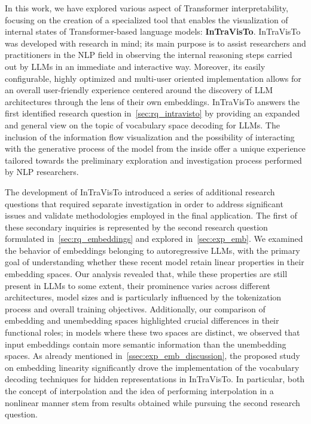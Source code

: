 In this work, we have explored various aspect of Transformer interpretability, focusing on the creation of a specialized tool that enables the visualization of internal states of Transformer-based language models: \textbf{InTraVisTo}.
InTraVisTo was developed with research in mind; its main purpose is to assist researchers and practitioners in the NLP field in observing the internal reasoning steps carried out by LLMs in an immediate and interactive way.
Moreover, its easily configurable, highly optimized and multi-user oriented implementation allows for an overall user-friendly experience centered around the discovery of LLM architectures through the lens of their own embeddings.
InTraVisTo answers the first identified research question in~\cref{sec:rq_intravisto} by providing an expanded and general view on the topic of vocabulary space decoding for LLMs.
The inclusion of the information flow visualization and the possibility of interacting with the generative process of the model from the inside offer a unique experience tailored towards the preliminary exploration and investigation process performed by NLP researchers.

The development of InTraVisTo introduced a series of additional research questions that required separate investigation in order to address significant issues and validate methodologies employed in the final application.
The first of these secondary inquiries is represented by the second research question formulated in~\cref{sec:rq_embeddings} and explored in~\cref{sec:exp_emb}.
We examined the behavior of embeddings belonging to autoregressive LLMs, with the primary goal of understanding whether these recent model retain linear properties in their embedding spaces.
Our analysis revealed that, while these properties are still present in LLMs to some extent, their prominence varies across different architectures, model sizes and is particularly influenced by the tokenization process and overall training objectives.
Additionally, our comparison of embedding and unembedding spaces highlighted crucial differences in their functional roles; in models where these two spaces are distinct, we observed that input embeddings contain more semantic information than the unembedding spaces.
As already mentioned in~\cref{ssec:exp_emb_discussion}, the proposed study on embedding linearity significantly drove the implementation of the vocabulary decoding techniques for hidden representations in InTraVisTo.
In particular, both the concept of interpolation and the idea of performing interpolation in a nonlinear manner stem from results obtained while pursuing the second research question.

